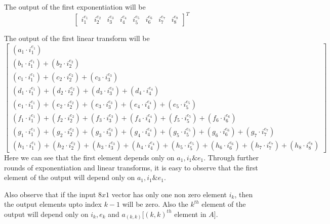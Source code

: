 \documentclass[10pt,twoside]{article}
\begin{document}
The output of the first exponentiation will be
  $$\begin{bmatrix}
    i_1^{e_1} & i_2^{e_2} & i_3^{e_3} & i_4^{e_4} & i_5^{e_5} & i_6^{e_6} & i_7^{e_7} & i_8^{e_8}
  \end{bmatrix}^T$$

The output of the first linear transform will be
  $$\begin{bmatrix}
    (a_1\cdot i_1^{e_1}) \\
    (b_1\cdot i_1^{e_1}) + (b_2\cdot i_2^{e_2}) \\
    (c_1\cdot i_1^{e_1}) + (c_2\cdot i_2^{e_2}) + (c_3\cdot i_3^{e_3}) \\
    (d_1\cdot i_1^{e_1}) + (d_2\cdot i_2^{e_2}) + (d_3\cdot i_3^{e_3}) + (d_4\cdot i_4^{e_4})\\
    (e_1\cdot i_1^{e_1}) + (e_2\cdot i_2^{e_2}) + (e_3\cdot i_3^{e_3}) + (e_4\cdot i_4^{e_4}) + (e_5\cdot i_5^{e_5})\\
    (f_1\cdot i_1^{e_1}) + (f_2\cdot i_2^{e_2}) + (f_3\cdot i_3^{e_3}) + (f_4\cdot i_4^{e_4}) + (f_5\cdot i_5^{e_5}) + (f_6\cdot i_6^{e_6})\\
    (g_1\cdot i_1^{e_1}) + (g_2\cdot i_2^{e_2}) + (g_3\cdot i_3^{e_3}) + (g_4\cdot i_4^{e_4}) + (g_5\cdot i_5^{e_5}) + (g_6\cdot i_6^{e_6}) + (g_7\cdot i_7^{e_7})\\
    (h_1\cdot i_1^{e_1}) + (h_2\cdot i_2^{e_2}) + (h_3\cdot i_3^{e_3}) + (h_4\cdot i_4^{e_4}) + (h_5\cdot i_5^{e_5}) + (h_6\cdot i_6^{e_6}) + (h_7\cdot i_7^{e_7}) + (h_8\cdot i_8^{e_8})
  \end{bmatrix}$$
Here we can see that the first element depends only on $a_1, i_1 \& e_1$. Through further rounds of exponentiation and linear transforms, it is easy to observe that the first element of the output will depend only on $a_1, i_1 \& e_1$.


Also observe that if the input $8x1$ vector has only one non zero element $i_k$, then the output elements upto index $k-1$ will be zero. Also the $k^{th}$ element of the output will depend only on $i_k, e_k  $ and $a_{(k, k)}$[$(k,k)^{th}$ element in $A$].\\
\end{document}
